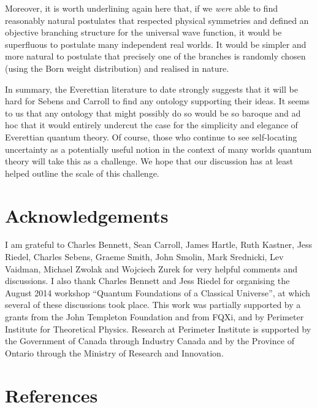 \documentclass[aps,prl]{revtex4}
\begin{document}
Moreover, it is worth underlining again here that, if we {\it were}
able to find reasonably natural postulates that respected physical
symmetries and defined
an objective branching structure for the universal wave
function, it would be superfluous to postulate many 
independent real worlds.  It would be simpler and more natural
to postulate that precisely one of the branches is randomly
chosen (using the Born weight distribution) and realised in
nature.    

In summary, the Everettian literature to date
strongly suggests that it will be hard for Sebens and Carroll
to find any ontology supporting their ideas.
It seems to us that any
ontology that might possibly do so would be so baroque and ad hoc
that it would entirely undercut the case for the simplicity and
elegance of Everettian quantum theory. 
Of course, those who continue to see self-locating uncertainty 
as a potentially useful notion in the 
context of many worlds quantum theory will
take this as a challenge.   We hope that our discussion
has at least helped outline the scale of this challenge. 

\section{Acknowledgements}
I am grateful to Charles Bennett,
Sean Carroll, James Hartle, Ruth Kastner, Jess Riedel, 
Charles Sebens, Graeme Smith, John Smolin, Mark Srednicki,
Lev Vaidman, Michael Zwolak
and Wojciech Zurek for very helpful comments and discussions. 
I also thank Charles Bennett and Jess Riedel for
organising the August 2014 workshop ``Quantum Foundations of a Classical
Universe'', at which several of these discussions took place.  
This work was partially supported by a 
grants from the John Templeton Foundation and from FQXi, 
and by Perimeter Institute
for Theoretical Physics. Research at Perimeter Institute is supported
by the Government of Canada through Industry Canada and by the
Province of Ontario through the Ministry of Research and Innovation.

\section*{References}


{}
\end{document}

